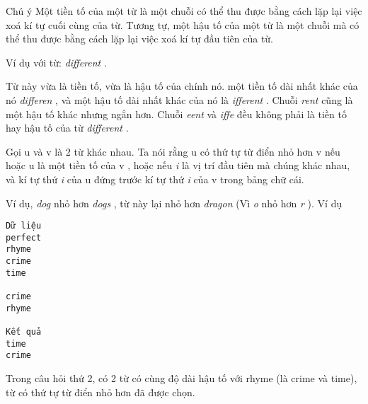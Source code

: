 Chú ý
Một tiền tố của một từ là một chuỗi có thể thu được bằng cách lặp lại việc xoá kí tự cuối cùng của từ. Tương tự, một hậu tố của một từ là một chuỗi mà có thể thu được bằng cách lặp lại việc xoá kí tự đầu tiên của từ.  

   Ví dụ với từ:   \textit{    different   }   .  

   Từ này vừa là tiền tố, vừa là hậu tố của chính nó. một tiền tố dài nhất khác của nó   \textit{    differen   }   , và một hậu tố dài nhất khác của nó là   \textit{    ifferent   }   . Chuỗi   \textit{    rent   }   cũng là một hậu tố khác nhưng ngắn hơn. Chuỗi   \textit{    eent   }   và   \textit{    iffe   }   đều không phải là tiền tố hay hậu tố của từ   \textit{    different   }   .  

   Gọi       u      và       v      là 2 từ khác nhau. Ta nói rằng       u      có thứ tự từ điển nhỏ hơn       v      nếu hoặc       u      là một tiền tố của       v      , hoặc nếu   \textit{    i   }   là vị trí đầu tiên mà chúng khác nhau, và kí tự thứ   \textit{    i   }   của       u      đứng trước kí tự thứ   \textit{    i   }   của       v      trong bảng chữ cái.  

   Ví dụ,   \textit{    dog   }   nhỏ hơn   \textit{    dogs   }   , từ này lại nhỏ hơn   \textit{    dragon   }   (Vì   \textit{    o   }   nhỏ hơn   \textit{    r   }   ).
Ví dụ
\begin{verbatim}
Dữ liệu
perfect
rhyme
crime
time

crime
rhyme

Kết quả
time
crime
\end{verbatim}

   Trong câu hỏi thứ 2, có 2 từ có cùng độ dài hậu tố với rhyme (là crime và time), từ có thứ tự từ điển nhỏ hơn đã được chọn.